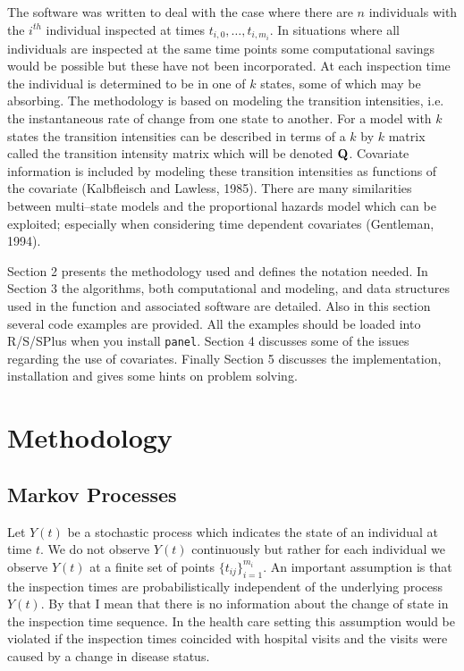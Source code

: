 \documentclass[12pt]{article}
\begin{document}
The software was written to deal with the case where there are $n$ individuals
with the $i^{th}$ individual inspected at times $t_{i,0},\ldots, t_{i,m_i}$.
In situations where all individuals are inspected at the same time points
some computational savings would be possible but these have not been
incorporated.
At each inspection time the individual is determined to be in one of $k$
states, some of which may be absorbing.
The methodology is based on modeling the transition intensities, i.e. 
the instantaneous rate of change from one state to another.
For a model with $k$ states the transition intensities can be described in 
terms of a $k$ by $k$ matrix called the transition intensity matrix which 
will be denoted ${\bf Q}$.
Covariate information is included by modeling these transition
intensities as functions of the covariate (Kalbfleisch and Lawless, 1985).
There are many similarities between multi--state models and the 
proportional hazards model which can be exploited; especially when 
considering time dependent covariates (Gentleman, 1994).

Section 2 presents the methodology used and defines the notation needed.
In Section 3 the algorithms, both computational and modeling, and data
structures used in the function and associated software are detailed.
Also in this section several code examples are provided.
All the examples should be loaded into R/S/SPlus when you install \verb+panel+.
Section 4 discusses some of the issues regarding the use of covariates.
Finally Section 5 discusses the implementation, installation and gives
some hints on problem solving.

\section{Methodology}

\subsection{Markov Processes}

Let $Y(t)$ be a stochastic process which indicates the state of an individual
at time $t$.
We do not observe $Y(t)$ continuously but rather for each individual we observe
$Y(t)$ at a finite set of points $\{t_{ij}\}_{i=1}^{m_i}$.
An important assumption is that the inspection times are probabilistically
independent of the underlying process $Y(t)$.
By that I mean that there is no information about the change of state
in the inspection time sequence.
In the health care setting
this assumption would be violated if the inspection times coincided with
hospital visits and the visits were caused by a change in disease status.
\end{document}
